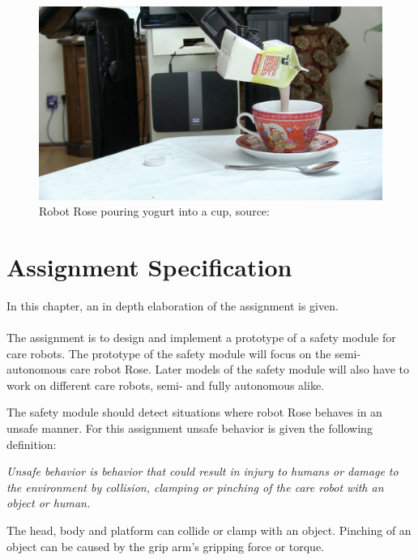\documentclass[12pt]{scrreprt}
\begin{document}
\begin{figure}[H]
    \centering
    \includegraphics[width=\textwidth]{Figures/pouring_milk_into_a_cup.jpg}
    \caption{Robot Rose pouring yogurt into a cup, source: \cite{rose_specification}}
    \label{fig:rose_milking}
\end{figure}

\chapter{Assignment Specification}

\label{Assignment specification}

In this chapter, an in depth elaboration of the assignment is given.
\\\\
The assignment is to design and implement a prototype of a safety module for care robots. The prototype of the safety module will focus on the semi-autonomous care robot Rose. Later models of the safety module will also have to work on different care robots, semi- and fully autonomous alike.
\par
The safety module should detect situations where robot Rose behaves in an unsafe manner. For this assignment unsafe behavior is given the following definition:
\begin{flushleft}
\textit{
Unsafe behavior is behavior that could result in injury to humans or damage to the environment by collision, clamping or pinching of the care robot with an object or human.
}
\end{flushleft}
The head, body and platform can collide or clamp with an object. Pinching of an object can be caused by the grip arm's gripping force or torque. %
 
\end{document}
